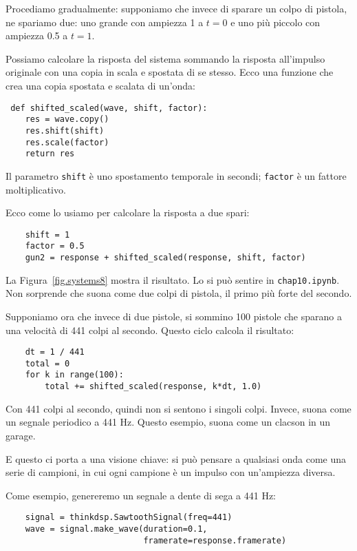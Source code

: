 \documentclass[12pt,a4paper]{book}
\begin{document}
Procediamo gradualmente: supponiamo che invece di sparare un colpo di pistola, ne spariamo due: uno grande con ampiezza 1 a $t=0$ e uno più piccolo con ampiezza 0.5 a $t=1$.

Possiamo calcolare la risposta del sistema sommando la risposta all'impulso originale con una copia in scala e spostata di se stesso. Ecco una funzione che crea una copia spostata e scalata di un'onda:

\begin{verbatim} def shifted_scaled(wave, shift, factor):
    res = wave.copy()
    res.shift(shift)
    res.scale(factor)
    return res
 \end{verbatim} 

Il parametro {\tt shift} è uno spostamento temporale in secondi; {\tt factor} è un fattore moltiplicativo.

Ecco come lo usiamo per calcolare la risposta a due spari:

\begin{verbatim} 
    shift = 1
    factor = 0.5
    gun2 = response + shifted_scaled(response, shift, factor)
 \end{verbatim} 

La Figura~\ref{fig.systems8} mostra il risultato. Lo si può sentire in {\tt chap10.ipynb}. Non sorprende che suona come due colpi di pistola, il primo più forte del secondo.

Supponiamo ora che invece di due pistole, si sommino 100 pistole che sparano a una velocità di 441 colpi al secondo. Questo ciclo calcola il risultato:

\begin{verbatim} 
    dt = 1 / 441
    total = 0
    for k in range(100):
        total += shifted_scaled(response, k*dt, 1.0)
 \end{verbatim} 

Con 441 colpi al secondo, quindi non si sentono i singoli colpi. Invece, suona come un segnale periodico a 441 Hz. Questo esempio, suona come un clacson in un garage.

E questo ci porta a una visione chiave: si può pensare a qualsiasi onda come una serie di campioni, in cui ogni campione è un impulso con un'ampiezza diversa.

Come esempio, genereremo un segnale a dente di sega a 441 Hz:

\begin{verbatim} 
    signal = thinkdsp.SawtoothSignal(freq=441)
    wave = signal.make_wave(duration=0.1,
                            framerate=response.framerate)
 \end{verbatim} 
\end{document}
